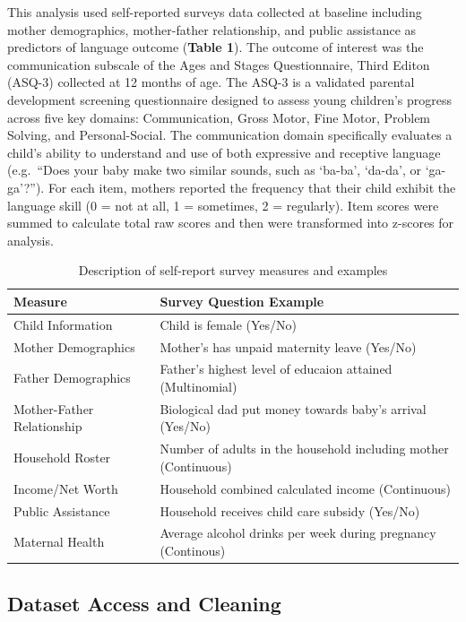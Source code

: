 \documentclass[sn-basic,pdflatex]{sn-jnl}
\begin{document}
This analysis used self-reported surveys data collected at baseline
including mother demographics, mother-father relationship, and public
assistance as predictors of language outcome (\textbf{Table 1}). The
outcome of interest was the communication subscale of the Ages and
Stages Questionnaire, Third Editon (ASQ-3) collected at 12 months of
age. The ASQ-3 is a validated parental development screening
questionnaire designed to assess young children's progress across five
key domains: Communication, Gross Motor, Fine Motor, Problem Solving,
and Personal-Social. The communication domain specifically evaluates a
child's ability to understand and use of both expressive and receptive
language (e.g.~``Does your baby make two similar sounds, such as
`ba-ba', `da-da', or `ga-ga'?''). For each item, mothers reported the
frequency that their child exhibit the language skill (0 = not at all, 1
= sometimes, 2 = regularly). Item scores were summed to calculate total
raw scores and then were transformed into z-scores for analysis.

\begin{table}
\centering
\caption{\label{tab:table_1}Description of self-report survey measures and examples}
\centering
\fontsize{10}{12}\selectfont
\begin{tabular}[t]{ll}
\toprule
Measure & Survey Question Example\\
\midrule
Child Information & Child is female (Yes/No)\\
Mother Demographics & Mother's has unpaid maternity leave (Yes/No)\\
Father Demographics & Father's highest level of educaion attained (Multinomial)\\
Mother-Father Relationship & Biological dad put money towards baby's arrival (Yes/No)\\
Household Roster & Number of adults in the household including mother (Continuous)\\
Income/Net Worth & Household combined calculated income (Continuous)\\
Public Assistance & Household receives child care subsidy (Yes/No)\\
Maternal Health & Average alcohol drinks per week during pregnancy (Continous)\\
\bottomrule
\end{tabular}
\end{table}

\subsection{Dataset Access and
Cleaning}\label{dataset-access-and-cleaning}
\end{document}
